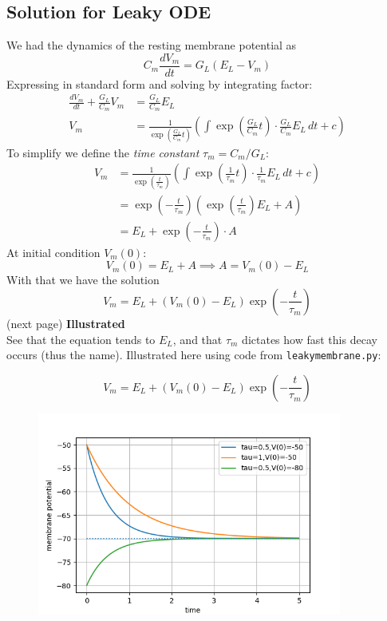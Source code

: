\documentclass{report}
\begin{document}
\subsection{Solution for Leaky ODE}
We had the dynamics of the resting membrane potential as
\begin{equation*}
C_m\frac{dV_m}{dt}=G_L(E_L-V_m)
\end{equation*}
Expressing in standard form and solving by integrating factor:
\begin{align*}
\frac{dV_m}{dt}+\frac{G_L}{C_m}V_m&=\frac{G_L}{C_m}E_L\\
V_m&=\frac{1}{\exp\left(\frac{G_L}{C_m}t\right)}\left(\int\exp\left(\frac{G_L}{C_m}t\right)\cdot\frac{G_L}{C_m}E_L\,dt+c\right)
\end{align*}
To simplify we define the \textit{time constant} $\tau_m=C_m/G_L$:
\begin{align*}
V_m&=\frac{1}{\exp\left(\frac{t}{\tau_m}\right)}\left(\int\exp\left(\frac{1}{\tau_m}t\right)\cdot\frac{1}{\tau_m}E_L\,dt+c\right)\\
&=\exp\left(-\frac{t}{\tau_m}\right)\left(\exp\left(\frac{t}{\tau_m}\right)E_L+A\right)\\
&=E_L+\exp\left(-\frac{t}{\tau_m}\right)\cdot A
\end{align*}
At initial condition $V_m(0)$:
\begin{equation*}
V_m(0)=E_L+A\implies A=V_m(0)-E_L
\end{equation*}
With that we have the solution
\begin{equation*}
V_m=E_L+(V_m(0)-E_L)\exp\left(-\frac{t}{\tau_m}\right)
\end{equation*}
(next page)
\newpage
\noindent\textbf{Illustrated}\\
See that the equation tends to $E_L$, and that $\tau_m$ dictates how fast this decay occurs (thus the name). Illustrated here using code from \texttt{leakymembrane.py}:
\begin{figure}[h]
\begin{equation*}
V_m=E_L+(V_m(0)-E_L)\exp\left(-\frac{t}{\tau_m}\right)
\end{equation*}
\begin{center}
\includegraphics[width=10cm]{2}\\
\end{center}
\end{figure}
\newpage
\end{document}

